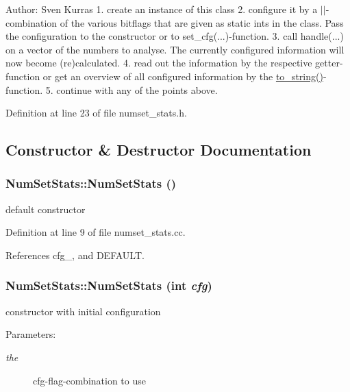 \begin{Desc}
\item[Author:]Sven Kurras 1. create an instance of this class 2. configure it by a $|$$|$-combination of the various bitflags that are given as static ints in the class. Pass the configuration to the constructor or to set\_\-cfg(...)-function. 3. call handle(...) on a vector of the numbers to analyse. The currently configured information will now become (re)calculated. 4. read out the information by the respective getter-function or get an overview of all configured information by the \hyperlink{class_num_set_stats_639732de39c31d82ade97d8e204db3c0}{to\_\-string()}-function. 5. continue with any of the points above. \end{Desc}


Definition at line 23 of file numset\_\-stats.h.

\subsection{Constructor \& Destructor Documentation}
\hypertarget{class_num_set_stats_889c116c12f1f1d08b71c78393abc2e4}{
\subsubsection[NumSetStats]{\setlength{\rightskip}{0pt plus 5cm}NumSetStats::NumSetStats ()}}
\label{class_num_set_stats_889c116c12f1f1d08b71c78393abc2e4}


default constructor 

Definition at line 9 of file numset\_\-stats.cc.

References cfg\_\-, and DEFAULT.\hypertarget{class_num_set_stats_6453c26039df38b6a9dd8e5c039d1db1}{
\subsubsection[NumSetStats]{\setlength{\rightskip}{0pt plus 5cm}NumSetStats::NumSetStats (int {\em cfg})}}
\label{class_num_set_stats_6453c26039df38b6a9dd8e5c039d1db1}


constructor with initial configuration \begin{Desc}
\item[Parameters:]
\begin{description}
\item[{\em the}]cfg-flag-combination to use \end{description}
\end{Desc}


